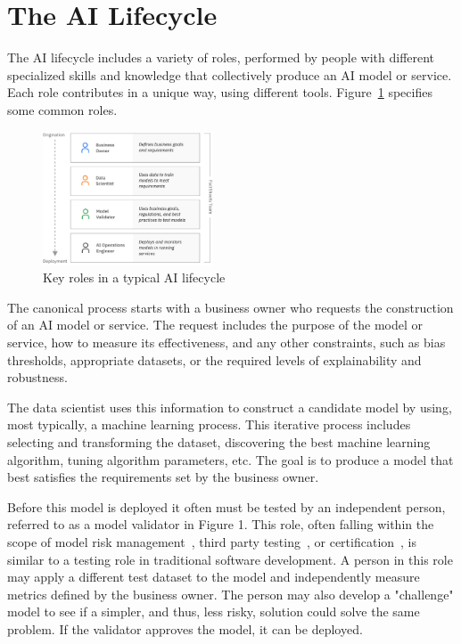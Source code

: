 \documentclass[11pt,dvipdfm]{article}
\begin{document}
\section{The AI Lifecycle}
\label{sec-lifecycle}
The AI lifecycle includes a variety of roles, performed by people with different specialized skills and knowledge that collectively produce an AI model or service. Each role contributes in a unique way, using different tools. Figure~\ref{fig:lifecycle} specifies some common roles.

\begin{figure}
    \centering
    \includegraphics[width=0.45\textwidth]{figs/Img1_Roles.eps}
    \caption{Key roles in a typical AI lifecycle}
    \label{fig:lifecycle}
\end{figure}

The canonical process starts with a business owner who requests the construction of an AI model or service. The request includes the purpose of the model or service, how to measure its effectiveness, and any other constraints, such as bias thresholds, appropriate datasets, or the required levels of explainability and robustness.

The data scientist uses this information to construct a candidate model by using, most typically, a machine learning process. This iterative process includes selecting and transforming the dataset, discovering the best machine learning algorithm, tuning algorithm parameters, etc. The goal is to produce a model that best satisfies the requirements set by the business owner.

Before this model is deployed it often must be tested by an independent person, referred to as a model validator in Figure 1.
This role, often falling within the scope of model risk management~\cite{model-risk-mgmt}, 
third party testing~\cite{3rd-party-testing,eu-testing}, or certification~\cite{certification,eu-testing}, is similar to a testing role in traditional software development. 
A person in this role may apply a different test dataset to the model and independently measure metrics defined by the business owner. 
The person may also develop a "challenge" model to see if a simpler, and thus, less risky, solution could solve the same problem.
If the validator approves the model, it can be deployed.
\end{document}
